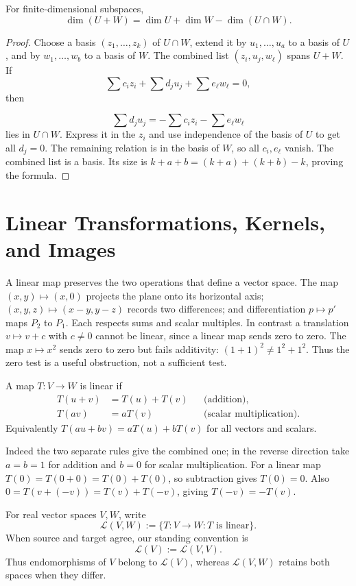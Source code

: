 \begin{proposition}\label{prop:dimension-sum}
For finite-dimensional subspaces,
\[
\dim(U+W)=\dim U+\dim W-\dim(U\cap W).
\]
\end{proposition}
\begin{proof}
Choose a basis $(z_1,\ldots,z_k)$ of $U\cap W$, extend it by
$u_1,\ldots,u_a$ to a basis of $U$, and by $w_1,\ldots,w_b$ to a basis
of $W$. The combined list $(z_i,u_j,w_\ell)$ spans $U+W$.
If
\[
\sum c_iz_i+\sum d_ju_j+\sum e_\ell w_\ell=0,
\]
 then

\[
\sum d_ju_j=-\sum c_iz_i-\sum e_\ell w_\ell
\]
 lies in $U\cap W$.
Express it in the $z_i$ and use independence of the basis of $U$ to get
all $d_j=0$. The remaining relation is in the basis of $W$, so all
$c_i,e_\ell$ vanish. The combined list is a basis. Its size is
$k+a+b=(k+a)+(k+b)-k$, proving the formula.
\end{proof}

\section{Linear Transformations, Kernels, and Images}
A linear map preserves the two operations that define a vector space.
The map $(x,y)\mapsto(x,0)$ projects the plane onto its horizontal axis;
$(x,y,z)\mapsto(x-y,y-z)$ records two differences; and differentiation
$p\mapsto p'$ maps $P_2$ to $P_1$. Each respects sums and scalar
multiples. In contrast a translation $v\mapsto v+c$ with $c\ne0$ cannot
be linear, since a linear map sends zero to zero. The map $x\mapsto x^2$
sends zero to zero but fails additivity: $(1+1)^2\ne1^2+1^2$.
Thus the zero test is a useful obstruction, not a sufficient test.

\begin{definition}
A map $T:V\to W$ is linear if
\begin{align*}
T(u+v)&=T(u)+T(v) &&\text{(addition)},\\
T(av)&=aT(v) &&\text{(scalar multiplication)}.
\end{align*}
Equivalently $T(au+bv)=aT(u)+bT(v)$ for all vectors and scalars.
\end{definition}
Indeed the two separate rules give the combined one; in the reverse
direction take $a=b=1$ for addition and $b=0$ for scalar multiplication.
For a linear map $T(0)=T(0+0)=T(0)+T(0)$, so subtraction gives $T(0)=0$.
Also $0=T(v+(-v))=T(v)+T(-v)$, giving $T(-v)=-T(v)$.

\begin{definition}\label{def:linear-map-space}
For real vector spaces $V,W$, write
\[
\mathcal L(V,W):=\{T:V\to W:T\text{ is linear}\}.
\]
When source and target agree, our standing convention is
\[
\boxed{\mathcal L(V):=\mathcal L(V,V).}
\]
Thus endomorphisms of $V$ belong to $\mathcal L(V)$, whereas
$\mathcal L(V,W)$ retains both spaces when they differ.
\end{definition}

